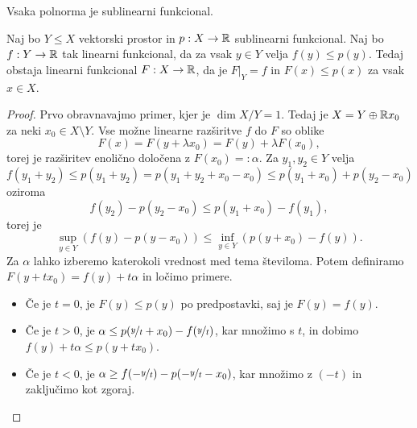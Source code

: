 \begin{primer}
  Vsaka polnorma je sublinearni funkcional.
\end{primer}

\begin{izrek}
  Naj bo $Y \le X$ vektorski prostor in $p: X \to \mathbb{R}$ sublinearni funkcional.
  Naj bo $f: Y \to \mathbb{R}$ tak linearni funkcional, da za vsak $y \in Y$ velja $f(y)
  \le p(y)$.
  Tedaj obstaja linearni funkcional $F: X \to \mathbb{R}$, da je $\left. F \right|_Y =
  f$ in $F(x) \le p(x)$ za vsak $x \in X$.
\end{izrek}

\begin{proof}
  Prvo obravnavajmo primer, kjer je $\dim X/Y = 1$.
  Tedaj je $X = Y \oplus \mathbb{R} x_0$ za neki $x_0 \in X \setminus Y$.
  Vse možne linearne razširitve $f$ do $F$ so oblike
  \[
	F(x) = F(y + \lambda x_0) = F(y) + \lambda F(x_0),
  \]
  torej je razširitev enolično določena z $F(x_0) =: \alpha$.
  Za $y_1, y_2 \in Y$ velja
  \[
	f(y_1 + y_2) \le p(y_1 + y_2) = p(y_1 + y_2 + x_0 - x_0)
	\le p(y_1 + x_0) + p(y_2 - x_0)
  \]
  oziroma
  \[
	f(y_2) - p(y_2 - x_0) \le p(y_1 + x_0) - f(y_1),
  \]
  torej je
  \[
	\sup_{y \in Y} \left( f(y) - p(y - x_0) \right)
	\le \inf_{y \in Y} \left( p(y + x_0) - f(y) \right).
  \]
  Za $\alpha$ lahko izberemo katerokoli vrednost med tema številoma.
  Potem definiramo $F(y + t x_0) = f(y) + t \alpha$ in ločimo primere.
  \begin{itemize}
  \item Če je $t = 0$, je $F(y) \le p(y)$ po predpostavki, saj je $F(y) = f(y)$.
  \item Če je $t > 0$, je $\alpha \le p(\nicefrac{y}{t} + x_0) -
	f(\nicefrac{y}{t})$, kar množimo s $t$, in dobimo $f(y) + t \alpha \le p(y +
	t x_0)$.
  \item Če je $t < 0$, je $\alpha \ge f(-\nicefrac{y}{t}) - p(-\nicefrac{y}{t} -
	x_0)$, kar množimo z $(-t)$ in zaključimo kot zgoraj.
  \end{itemize}

\end{proof}

